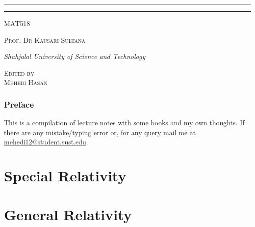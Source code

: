 \documentclass[12pt,oneside,reqno]{book}
\newcommand{\course}{MAT518}
\newcommand{\prof}{Prof. Dr Kausari Sultana}
\begin{document}
\begin{titlepage}
\rule{345pt}{0.4pt}\vspace*{-\baselineskip}\vspace{3.2pt}
\rule{345pt}{1.6pt}

\vspace{2\baselineskip}

{\scshape \Large{\course}} 

\vspace*{5\baselineskip}



\vspace{0.5\baselineskip} 

{\scshape   \Large \prof\\ }

\vspace{0.75\baselineskip} 

{\textit{\large Shahjalal University of Science and Technology}} 

\vfill 

\vspace{0.3\baselineskip} 


{\scshape \large Edited by\\  Mehedi Hasan} 
\vspace*{40pt}
\end{titlepage}
\newpage
\section*{Preface}
This is a compilation of lecture notes with some books and my own thoughts. If there are any mistake/typing error or, for any query mail me at \href{mailto:mehedi12@student.sust.edu}{mehedi12@student.sust.edu}.
\newpage
\tableofcontents
\newpage
{}

% 
\part{Special Relativity}
\part{General Relativity}



\end{document}
